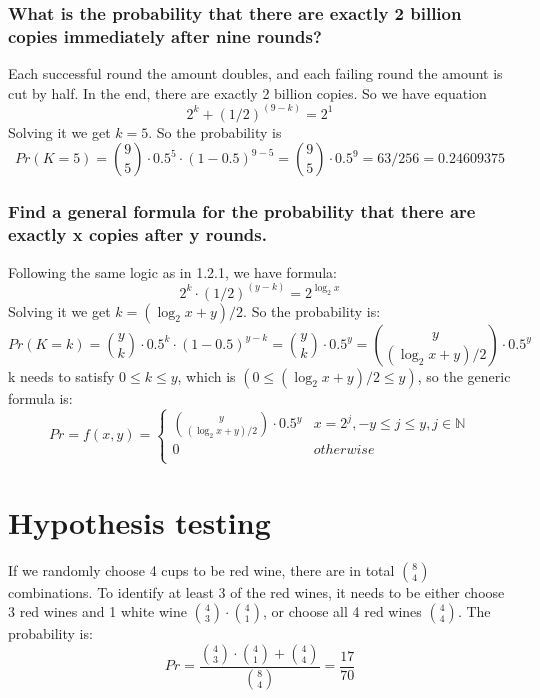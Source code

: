\documentclass{article}
\begin{document}
\subsubsection{What is the probability that there are exactly 2 billion copies immediately after nine rounds?}

Each successful round the amount doubles, and each failing round the amount is cut by half. In the end, there are exactly 2 billion copies. So we have equation\\
\[ 2^k + (1/2)^{(9-k)} = 2^1 \]
Solving it we get \( k = 5 \). So the probability is \\
\[
Pr(K = 5) = {9 \choose 5} \cdot 0.5^5 \cdot (1-0.5)^{9-5} = {9 \choose 5} \cdot 0.5^9 = 63/256 = 0.24609375
\]

\subsubsection{Find a general formula for the probability that there are exactly x copies after y rounds.}
Following the same logic as in 1.2.1, we have formula: \\
\[
2^k \cdot (1/2)^{(y-k)} = 2^{\log_2 x}
\]
Solving it we get \( k = ({\log_2 x} + y)/2 \). So the probability is:\\
\[
Pr(K = k) = {y \choose k} \cdot 0.5^k \cdot (1 - 0.5)^{y-k} = {y \choose k} \cdot 0.5^y = 
{y \choose ({\log_2 x} + y )/2} \cdot 0.5^y
\]
k needs to satisfy \( 0 \leq k \leq y \), which is \( (0 \leq ({\log_2 x} + y )/2 \leq y)\), so the generic formula is:\\
\[
Pr = f(x,y) = \left\{
\begin{array}{ll}
      {y \choose ({\log_2 x} + y )/2} \cdot 0.5^y & x = 2^j, -y \leq j \leq y, j \in \mathbb{N} \\
      0 & otherwise\\
\end{array} 
\right.
\]

\section{Hypothesis testing}
If we randomly choose 4 cups to be red wine, there are in total \( {8 \choose 4 }\) combinations.
To identify at least 3 of the red wines, it needs to be either choose 3 red wines and 1 white wine \( {4 \choose 3} \cdot {4 \choose 1}\), or choose all 4 red wines \( {4 \choose 4 }\).
The probability is:\\
\[
Pr = \frac{{4 \choose 3} \cdot {4 \choose 1} + {4 \choose 4}}{{8 \choose 4}} = \frac{17}{70}
\]
\end{document}
